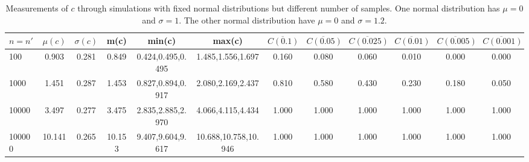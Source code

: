 \begin{table*}[h!]
\begin{center}
\begin{tabular}{| l | c | c | c | c | c | c | c | c | c | c | c |}\hline
$n=n'$ & $\mu(c)$ & $\sigma(c)$ & m(c) & min(c) & max(c) & $\overline{C(0.1)}$ & $\overline{C(0.05)}$ & $\overline{C(0.025)}$ & $\overline{C(0.01)}$ & $\overline{C(0.005)}$ & $\overline{C(0.001)}$ \\\hline
100 & 0.903 & 0.281 & 0.849 & 0.424,0.495,0.495 & 1.485,1.556,1.697  & 0.160  & 0.080  & 0.060  & 0.010  & 0.000  & 0.000 \\\hline
1000 & 1.451 & 0.287 & 1.453 & 0.827,0.894,0.917 & 2.080,2.169,2.437  & 0.810  & 0.580  & 0.430  & 0.230  & 0.180  & 0.050 \\\hline
10000 & 3.497 & 0.277 & 3.475 & 2.835,2.885,2.970 & 4.066,4.115,4.434  & 1.000  & 1.000  & 1.000  & 1.000  & 1.000  & 1.000 \\\hline
100000 & 10.141 & 0.265 & 10.153 & 9.407,9.604,9.617 & 10.688,10.758,10.946  & 1.000  & 1.000  & 1.000  & 1.000  & 1.000  & 1.000 \\\hline
\end{tabular}
\caption{Measurements of $c$ through simulations
        with fixed normal distributions but different number of samples.
        One normal distribution has $\mu=0$ and $\sigma=1$.
        The other normal distribution have
        $\mu=0$ and $\sigma=1.2$.}
\end{center}
\end{table*}